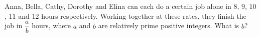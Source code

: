 Anna, Bella, Cathy, Dorothy and Elina can each do a certain job alone in $8$, $9$, $10$, $11$ and $12$ hours respectively. Working together at these rates, they finish the job in $\dfrac ab$ hours, where $a$ and $b$ are relatively prime positive integers. What is $b$?
